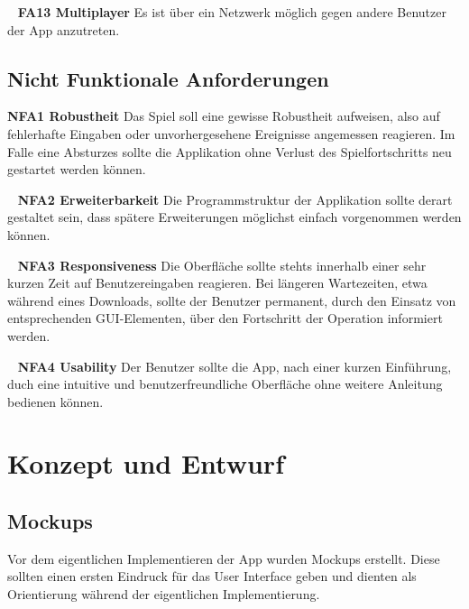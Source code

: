\documentclass{scrartcl}
\begin{document}
\ \newline
\textbf{FA13 Multiplayer} \newline
Es ist über ein Netzwerk möglich gegen andere Benutzer der App anzutreten.


\subsection{Nicht Funktionale Anforderungen}

\textbf{NFA1 Robustheit} \newline
Das Spiel soll eine gewisse Robustheit aufweisen, also auf fehlerhafte Eingaben
oder unvorhergesehene Ereignisse angemessen reagieren. Im Falle eine Absturzes
sollte die Applikation ohne Verlust des Spielfortschritts neu gestartet werden
können.

\ \newline
\textbf{NFA2 Erweiterbarkeit} \newline
Die Programmstruktur der Applikation sollte derart gestaltet sein, dass
spätere Erweiterungen möglichst einfach vorgenommen werden können.

\ \newline
\textbf{NFA3 Responsiveness} \newline
Die Oberfläche sollte stehts innerhalb einer sehr kurzen Zeit auf
Benutzereingaben reagieren. Bei längeren Wartezeiten, etwa während eines
Downloads, sollte der Benutzer permanent, durch den Einsatz von entsprechenden
GUI-Elementen, über den Fortschritt der Operation informiert werden.

\ \newline
\textbf{NFA4 Usability} \newline
Der Benutzer sollte die App, nach einer kurzen Einführung, duch eine intuitive
und benutzerfreundliche Oberfläche ohne weitere Anleitung bedienen können.

\section{Konzept und Entwurf}
\subsection{Mockups}
Vor dem eigentlichen Implementieren der App wurden Mockups erstellt. Diese sollten einen ersten Eindruck für das User Interface geben und dienten als Orientierung während der eigentlichen Implementierung.
\end{document}
